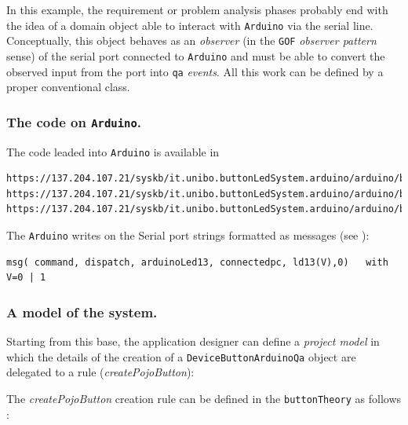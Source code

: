 In this example, the requirement or problem analysis phases probably end with the idea of a domain object able to interact with \texttt{Arduino} via the serial line. Conceptually, this object behaves as an \textit{observer} (in the \texttt{GOF} \textit{observer pattern} sense) of the serial port connected to \texttt{Arduino} and must be able to convert the observed input from the port into \texttt{qa} \textit{events}.
All this work can be defined by a proper conventional \java{} class.

\subsubsection{The code on \texttt{Arduino}.}
The code leaded into  \texttt{Arduino} is available in 

\begin{Verbatim}[fontsize=\scriptsize, frame=single , label=Arduino code site]
https://137.204.107.21/syskb/it.unibo.buttonLedSystem.arduino/arduino/blsMain/blsMain.ino
https://137.204.107.21/syskb/it.unibo.buttonLedSystem.arduino/arduino/blsMain/bls.h
https://137.204.107.21/syskb/it.unibo.buttonLedSystem.arduino/arduino/blsMain/bls.cpp
\end{Verbatim}

The \texttt{Arduino} writes on the Serial port strings formatted as \qa{} messages (see ):

\begin{lstlisting}
msg( command, dispatch, arduinoLed13, connectedpc, ld13(V),0) 	with V=0 | 1  
\end{lstlisting}




 
\subsubsection{A \qa{} model of the system.}
Starting from this base, the application designer can define a \textit{project model} in which the details of the creation of a \texttt{DeviceButtonArduinoQa} object are delegated to a \prolog{} rule (\textit{createPojoButton}):

  

The \textit{createPojoButton} creation rule can be defined in the \texttt{buttonTheory} as follows :

